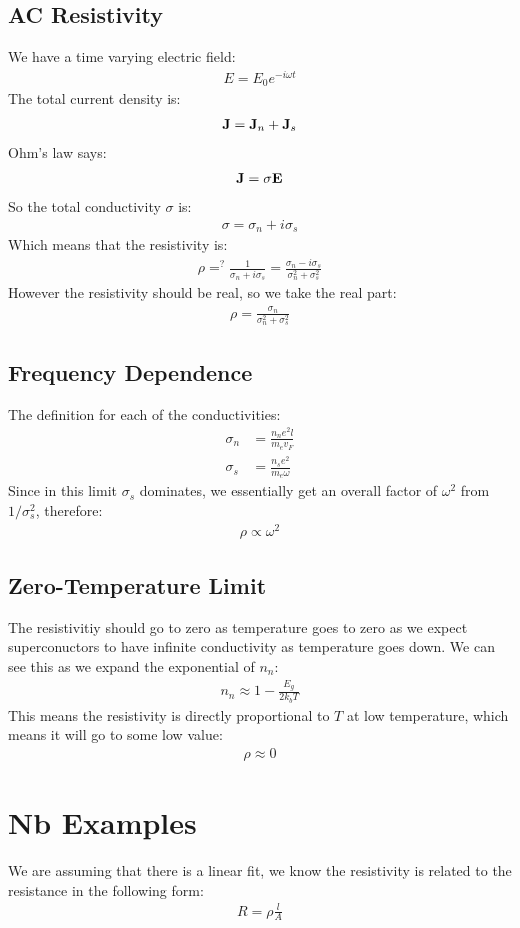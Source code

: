\documentclass[12pt]{article}
\begin{document}
\subsection{AC Resistivity}
We have a time varying electric field:
\begin{align*}
  E=E_0e^{-i\omega t}
\end{align*}
The total current density is:
\begin{align*}
  \vb{J}=\vb{J}_n+\vb{J}_s
\end{align*}
Ohm's law says:
\begin{align*}
  \vb{J=\sigma E}
\end{align*}
So the total conductivity $\sigma$ is:
\begin{align*}
  \sigma=\sigma_n+i\sigma_s
\end{align*}
Which means that the resistivity is:
\begin{align*}
  \rho=^?\frac{1}{\sigma_n+i\sigma_s}=\frac{\sigma_n-i\sigma_s}
  {\sigma_n^2+\sigma_s^2}
\end{align*}
However the resistivity should be real, so we take the real part:
\begin{align*}
  \boxed{\rho=\frac{\sigma_n}{\sigma_n^2+\sigma_s^2}}
\end{align*}
\subsection{Frequency Dependence}
The definition for each of the conductivities:
\begin{align*}
  \sigma_n&=\frac{n_ne^2l}{m_ev_F}\\
  \sigma_s&=\frac{n_se^2}{m_e\omega}
\end{align*}
Since in this limit $\sigma_s$ dominates, we essentially get an overall factor of $\omega^2$ from $1/\sigma_s^2$, therefore:
\begin{align*}
  \boxed{\rho\propto\omega^2}
\end{align*}
\subsection{Zero-Temperature Limit}
The resistivitiy should go to zero as temperature goes to zero as we expect superconuctors to have infinite conductivity as temperature goes down. We can see this as we expand the exponential of $n_n$:
\begin{align*}
  n_n\approx 1-\frac{E_g}{2k_bT}
\end{align*}
This means the resistivity is directly proportional to $T$ at low temperature, which means it will go to some low value:
\begin{align*}
  \rho\approx0
\end{align*}
\newpage\section{Nb Examples}
We are assuming that there is a linear fit, we know the resistivity is related to the resistance in the following form:
\begin{align*}
  R=\rho\frac{l}{A}
\end{align*}
\end{document}
